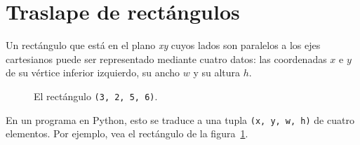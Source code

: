 \section{Traslape de rectángulos}

Un rectángulo que está en el plano \emph{xy} cuyos lados son paralelos a
los ejes cartesianos puede ser representado mediante cuatro datos:
las coordenadas \(x\) e \(y\) de su vértice inferior izquierdo,
su ancho \(w\) y su altura \(h\).

\begin{figure}
  \centering
  
  \caption{El rectángulo \lstinline!(3, 2, 5, 6)!.}
  \label{fig:rect1}
\end{figure}

En un programa en Python, esto se traduce a una tupla
\lstinline!(x, y, w, h)! de cuatro elementos.
Por ejemplo, vea el rectángulo de la figura~\ref{fig:rect1}.

